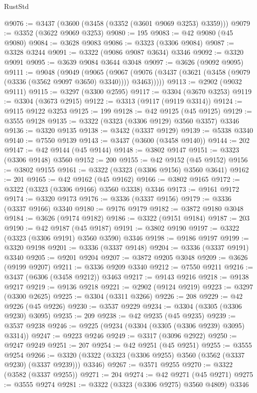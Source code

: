 \begin{lexlean}{RustStd}
\begin{coremodule}
@9076 := @3437 (@3600 (@3458 (@3352 (@3601 @9069 @3253) @3359)))
@9079 := @3352 (@3622 @9069 @3253)
@9080 := 195
@9083 := @42 @9080 (@45 @9080)
@9084 := @3628 @9083
@9086 := @3323 (@3306 @9084)
@9087 := @3328 @3244
@9091 := @3322 (@9086 @9087 @3634) @3346
@9092 := @3320 @9091
@9095 := @3639 @9084 @3644 @3048
@9097 := @3626 (@9092 @9095)
@9111 := @9048
    (@9049
      (@9065
        (@9067 (@9076 (@3437 (@3621 (@3458 (@9079 (@3336 (@3562 @9097 @3650) @3340)))) @3463)))))
@9113 := @2902 (@9032 @9111)
@9115 := @3297 (@3300 @2595)
@9117 := @3304 (@3670 @3253)
@9119 := @3304 (@3673 @2915)
@9122 := @3313 (@9117 (@9119 @3314))
@9124 := @9115 @9122 @3253
@9125 := 199
@9128 := @42 @9125 (@45 @9125)
@9129 := @3555 @9128
@9135 := @3322 (@3323 (@3306 @9129) @3560 @3357) @3346
@9136 := @3320 @9135
@9138 := @3432 (@3337 @9129)
@9139 := @5338 @3340
@9140 := @7550 @9139
@9143 := @3437 (@3600 (@3458 @9140))
@9144 := 202
@9147 := @42 @9144 (@45 @9144)
@9148 := @3802 @9147
@9151 := @3323 (@3306 @9148) @3560
@9152 := 200
@9155 := @42 @9152 (@45 @9152)
@9156 := @3802 @9155
@9161 := @3322 (@3323 (@3306 @9156) @3560 @3641)
@9162 := 201
@9165 := @42 @9162 (@45 @9162)
@9166 := @3802 @9165
@9172 := @3322 (@3323 (@3306 @9166) @3560 @3338) @3346
@9173 := @9161 @9172
@9174 := @3320 @9173
@9176 := @3336 (@3337 @9156)
@9179 := @3336 (@3337 @9166) @3340
@9180 := @9176 @9179
@9182 := @3872 @9180 @3048
@9184 := @3626 (@9174 @9182)
@9186 := @3322 (@9151 @9184)
@9187 := 203
@9190 := @42 @9187 (@45 @9187)
@9191 := @3802 @9190
@9197 := @3322 (@3323 (@3306 @9191) @3560 @3590) @3346
@9198 := @9186 @9197
@9199 := @3320 @9198
@9201 := @3336 (@3337 @9148)
@9204 := @3336 (@3337 @9191) @3340
@9205 := @9201 @9204
@9207 := @3872 @9205 @3048
@9209 := @3626 (@9199 @9207)
@9211 := @3336 @9209 @3340
@9212 := @7550 @9211
@9216 := @3437 (@6306 (@3458 @9212)) @3463
@9217 := @9143 @9216
@9218 := @9138 @9217
@9219 := @9136 @9218
@9221 := @2902 (@9124 @9219)
@9223 := @3297 (@3300 @2625)
@9225 := @3304 (@3311 @3266)
@9226 := 208
@9229 := @42 @9226 (@45 @9226)
@9230 := @3537 @9229
@9234 := @3304 (@3305 (@3306 @9230) @3095)
@9235 := 209
@9238 := @42 @9235 (@45 @9235)
@9239 := @3537 @9238
@9246 := @9225 (@9234 (@3304 (@3305 (@3306 @9239) @3095) @3314))
@9247 := @9223 @9246
@9249 := @3317 (@3096 @2922)
@9250 := @9247 @9249
@9251 := 207
@9254 := @42 @9251 (@45 @9251)
@9255 := @3555 @9254
@9266 := @3320 (@3322 (@3323 (@3306 @9255) @3560 (@3562 (@3337 @9230) (@3337 @9239))) @3346)
@9267 := @3571 @9255
@9270 := @3322 (@3582 (@3337 @9255))
@9271 := 204
@9274 := @42 @9271 (@45 @9271)
@9275 := @3555 @9274
@9281 := @3322 (@3323 (@3306 @9275) @3560 @4809) @3346

\end{coremodule}
\end{lexlean}
